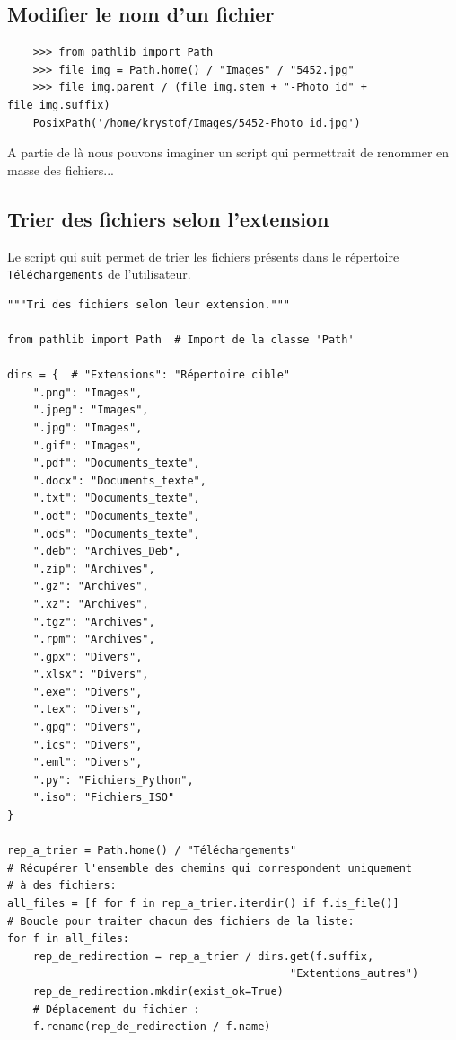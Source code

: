 \documentclass[a4paper,12pt]{book}
\begin{document}
\subsection*{Modifier le nom d'un fichier}
\begin{verbatim}
    >>> from pathlib import Path
    >>> file_img = Path.home() / "Images" / "5452.jpg"
    >>> file_img.parent / (file_img.stem + "-Photo_id" + file_img.suffix)
    PosixPath('/home/krystof/Images/5452-Photo_id.jpg')
\end{verbatim}
\medskip

A partie de là nous pouvons imaginer un script qui permettrait de renommer en masse des fichiers...
\medskip

\subsection*{Trier des fichiers selon l'extension}
Le script qui suit permet de trier les fichiers présents dans le répertoire \texttt{Téléchargements} de l'utilisateur.
\begin{lstlisting}[caption=Trier des fichiers]
"""Tri des fichiers selon leur extension."""

from pathlib import Path  # Import de la classe 'Path'

dirs = {  # "Extensions": "Répertoire cible"
    ".png": "Images",
    ".jpeg": "Images",
    ".jpg": "Images",
    ".gif": "Images",
    ".pdf": "Documents_texte",
    ".docx": "Documents_texte",
    ".txt": "Documents_texte",
    ".odt": "Documents_texte",
    ".ods": "Documents_texte",
    ".deb": "Archives_Deb",
    ".zip": "Archives",
    ".gz": "Archives",
    ".xz": "Archives",
    ".tgz": "Archives",
    ".rpm": "Archives",
    ".gpx": "Divers",
    ".xlsx": "Divers",
    ".exe": "Divers",
    ".tex": "Divers",
    ".gpg": "Divers",
    ".ics": "Divers",
    ".eml": "Divers",
    ".py": "Fichiers_Python",
    ".iso": "Fichiers_ISO"
}

rep_a_trier = Path.home() / "Téléchargements"
# Récupérer l'ensemble des chemins qui correspondent uniquement 
# à des fichiers:
all_files = [f for f in rep_a_trier.iterdir() if f.is_file()]
# Boucle pour traiter chacun des fichiers de la liste:
for f in all_files:
    rep_de_redirection = rep_a_trier / dirs.get(f.suffix, 
                                            "Extentions_autres")
    rep_de_redirection.mkdir(exist_ok=True)
    # Déplacement du fichier :
    f.rename(rep_de_redirection / f.name)  
\end{lstlisting}
\medskip
\end{document}
